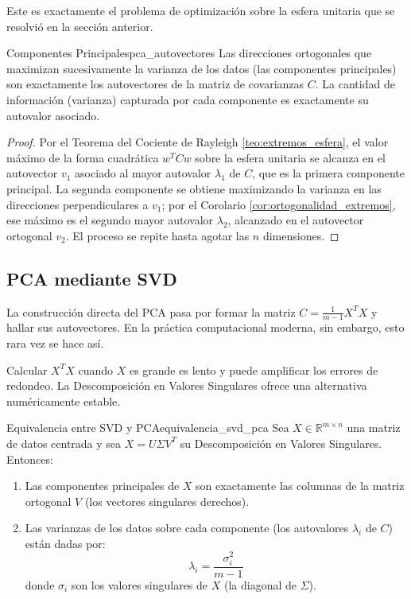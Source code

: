 \documentclass[11pt, a4paper]{article}
\begin{document}
Este es exactamente el problema de optimización sobre la esfera unitaria que se resolvió en la sección anterior.

\begin{proposicion}{Componentes Principales}{pca_autovectores}
Las direcciones ortogonales que maximizan sucesivamente la varianza de los datos (las componentes principales) son exactamente los autovectores de la matriz de covarianzas $C$. La cantidad de información (varianza) capturada por cada componente es exactamente su autovalor asociado.
\end{proposicion}

\begin{proof}
Por el Teorema del Cociente de Rayleigh \ref{teo:extremos_esfera}, el valor máximo de la forma cuadrática $w^T C w$ sobre la esfera unitaria se alcanza en el autovector $v_1$ asociado al mayor autovalor $\lambda_1$ de $C$, que es la primera componente principal. La segunda componente se obtiene maximizando la varianza en las direcciones perpendiculares a $v_1$; por el Corolario \ref{cor:ortogonalidad_extremos}, ese máximo es el segundo mayor autovalor $\lambda_2$, alcanzado en el autovector ortogonal $v_2$. El proceso se repite hasta agotar las $n$ dimensiones.
\end{proof}

\subsection{PCA mediante SVD}

La construcción directa del PCA pasa por formar la matriz $C = \frac{1}{m-1} X^T X$ y hallar sus autovectores. En la práctica computacional moderna, sin embargo, esto rara vez se hace así.

Calcular $X^T X$ cuando $X$ es grande es lento y puede amplificar los errores de redondeo. La Descomposición en Valores Singulares ofrece una alternativa numéricamente estable.

\begin{teorema}{Equivalencia entre SVD y PCA}{equivalencia_svd_pca}
Sea $X \in \mathbb{R}^{m \times n}$ una matriz de datos centrada y sea $X = U \Sigma V^T$ su Descomposición en Valores Singulares. Entonces:
\begin{enumerate}
    \item[i)] Las componentes principales de $X$ son exactamente las columnas de la matriz ortogonal $V$ (los vectores singulares derechos).
    \item[ii)] Las varianzas de los datos sobre cada componente (los autovalores $\lambda_i$ de $C$) están dadas por:
    \[ \lambda_i = \frac{\sigma_i^2}{m-1} \]
    donde $\sigma_i$ son los valores singulares de $X$ (la diagonal de $\Sigma$).
\end{enumerate}
\end{teorema}
\end{document}
